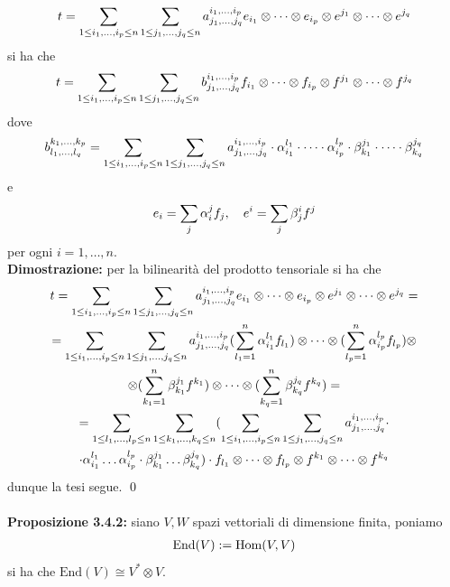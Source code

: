 \documentclass{article}
\begin{document}
\begin{gather}
    t = \sum_{1 \leq i_1, \dots, i_p \leq n} \sum_{1 \leq j_1, \dots, j_q \leq n} a^{i_1, \dots, i_p}_{j_1, \dots, j_q} e_{i_1} \otimes \dots \otimes e_{i_p} \otimes e^{j_1} \otimes \dots \otimes e^{j_q} \notag
\end{gather}
si ha che
\begin{gather}
    t = \sum_{1 \leq i_1, \dots, i_p \leq n} \sum_{1 \leq j_1, \dots, j_q \leq n} b^{i_1, \dots, i_p}_{j_1, \dots, j_q} f_{i_1} \otimes \dots \otimes f_{i_p} \otimes f^{j_1} \otimes \dots \otimes f^{j_q} \notag
\end{gather}
dove
\begin{gather}
    b^{k_1, \dots, k_p}_{l_1, \dots, l_q} = \sum_{1 \leq i_1, \dots, i_p \leq n} \sum_{1 \leq j_1, \dots, j_q \leq n} a^{i_1, \dots, i_p}_{j_1, \dots, j_q} \cdot \alpha^{l_1}_{i_1} \cdot \dots \cdot \alpha^{l_p}_{i_p} \cdot \beta^{j_1}_{k_1} \cdot \dots \cdot \beta^{j_q}_{k_q} \notag
\end{gather}
e
\begin{gather}
    e_i = \sum_{j} \alpha_i^j f_j, \quad e^i = \sum_j \beta^i_j f^j \notag
\end{gather}
per ogni $i = 1, \dots, n$. \\

\textbf{Dimostrazione:} per la bilinearità del prodotto tensoriale si ha che
\begin{gather*}
    t = \sum_{1 \leq i_1, \dots, i_p \leq n} \sum_{1 \leq j_1, \dots, j_q \leq n} a^{i_1, \dots, i_p}_{j_1, \dots, j_q} e_{i_1} \otimes \dots \otimes e_{i_p} \otimes e^{j_1} \otimes \dots \otimes e^{j_q} = \notag \\
    = \sum_{1 \leq i_1, \dots, i_p \leq n} \sum_{1 \leq j_1, \dots, j_q \leq n} a^{i_1, \dots, i_p}_{j_1, \dots, j_q} (\sum_{l_1 = 1}^n \alpha_{i_1}^{l_1}f_{l_1}) \otimes \dots \otimes (\sum_{l_p = 1}^n \alpha_{i_p}^{l_p}f_{l_p}) \otimes \notag \\
    \otimes (\sum_{k_1 = 1}^n \beta^{j_1}_{k_1} f^{k_1}) \otimes \dots \otimes (\sum_{k_q = 1}^n \beta^{j_q}_{k_q} f^{k_q}) \notag = \\
    = \sum_{1 \leq l_1, \dots, l_p \leq n} \sum_{1 \leq k_1, \dots, k_q \leq n} (\sum_{1 \leq i_1, \dots, i_p \leq n} \sum_{1 \leq j_1, \dots, j_q \leq n} a^{i_1, \dots, i_p}_{j_1, \dots, j_q} \cdot \notag \\ 
    \cdot \alpha^{l_1}_{i_1} \dots \alpha^{l_p}_{i_p} \cdot \beta^{j_1}_{k_1} \dots \beta^{j_q}_{k_q}) \cdot f_{l_1} \otimes \dots \otimes f_{l_p} \otimes f^{k_1} \otimes \dots \otimes f^{k_q} \notag
\end{gather*}
dunque la tesi segue. \qed \\ \\
\textbf{Proposizione 3.4.2:} siano $V, W$ spazi vettoriali di dimensione finita, poniamo
\begin{gather}
    \mathrm{End}(V) := \mathrm{Hom}(V, V) \notag
\end{gather}
si ha che $\mathrm{End}(V) \cong V^* \otimes V$. \\
\end{document}
